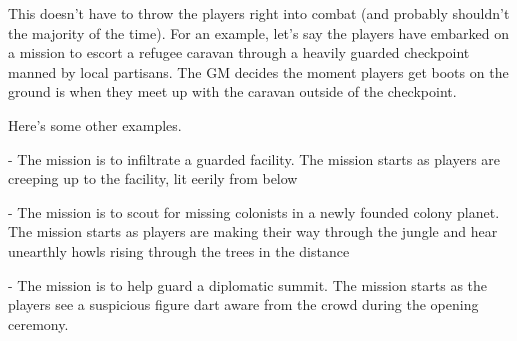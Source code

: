 This doesn’t have to throw the players right into combat (and probably shouldn’t the majority of  
the time). For an example, let’s say the players have embarked on a mission to escort a refugee  
caravan through a heavily guarded checkpoint manned by local partisans. The GM decides the  
moment players get boots on the ground is when they meet up with the caravan outside of the  
checkpoint.
 

Here’s some other examples.
 
         	- The mission is to infiltrate a guarded facility. The mission starts as players are creeping  
         up to the facility, lit eerily from below
 
         	- The mission is to scout for missing colonists in a newly founded colony planet. The  
         mission starts as players are making their way through the jungle and hear unearthly  
         howls rising through the trees in the distance
 
         	- The mission is to help guard a diplomatic summit. The mission starts as the players see  
         a suspicious figure dart aware from the crowd during the opening ceremony.
 